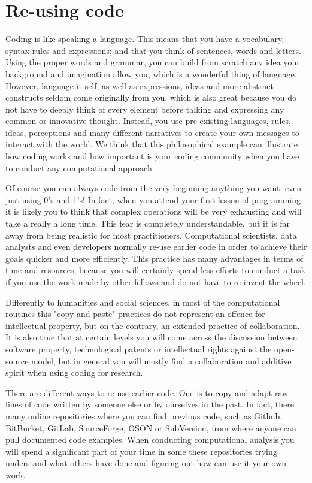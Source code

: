 \section{Re-using code}
\label{sec:code}

Coding is like speaking a language. This means that you have a vocabulary, syntax rules and expressions; and that you think of sentences, words and letters. Using the proper words and grammar, you can build from scratch any idea your background and imagination allow you, which is a wonderful thing of language. However, language it self, as well as expressions, ideas and more abstract constructs seldom come originally from you, which is also great because you do not have to deeply think of every element before talking and expressing any common or innovative thought. Instead, you use pre-existing languages, rules, ideas, perceptions and many different narratives to create your own messages to interact with the world. We think that this philosophical example can illustrate how coding works and how important is your coding community when you have to conduct any computational approach.

Of course you can always code from the very beginning anything you want: even just using 0's and 1's! In fact, when you attend your first lesson of programming it is likely you to think that complex operations will be very exhausting and will take a really a long time. This fear is completely understandable, but it is far away from being realistic for most practitioners. Computational scientists, data analysts and even developers normally re-use earlier code in order to achieve their goals quicker and more efficiently. This practice has many advantages in terms of time and resources, because you will certainly spend less efforts to conduct a task if you use the work made by other fellows and do not have to re-invent the wheel.

Differently to humanities and social sciences, in most of the computational routines this "copy-and-paste" practices do not represent an offence for intellectual property, but on the contrary, an extended practice of collaboration. It is also true that at certain levels you will come across the discussion between software property, technological patents or intellectual rights against the open-source model, but in general you will mostly find a collaboration and additive spirit when using coding for research.

There are different ways to re-use earlier code. One is to copy and adapt raw lines of code written by someone else or by ourselves in the past. In fact, there many online repositories where you can find previous code, such as Github, BitBucket, GitLab, SourceForge, OSON or SubVersion, from where anyone can pull documented code examples. When conducting computational analysis you will spend a significant part of your time in some these repositories trying understand what others have done and figuring out how can use it your own work.

